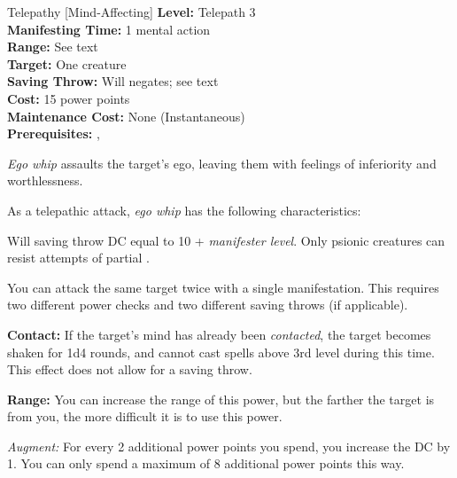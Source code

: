 {Telepathy [Mind-Affecting]}
{
	\textbf{Level:}
	Telepath 3\\
	\textbf{Manifesting Time:}
	1 mental action\\
	\textbf{Range:}
	See text\\
	\textbf{Target:}
	One creature\\
	\textbf{Saving Throw:}
	Will negates; see text\\
	\textbf{Cost:}
	15 power points\\
	\textbf{Maintenance Cost:}
	None (Instantaneous)\\
	\textbf{Prerequisites:}
	, \\
}
{
	\emph{Ego whip} assaults the target's ego, leaving them with feelings of inferiority and worthlessness.

	As a telepathic attack, \emph{ego whip} has the following characteristics:
	\begin{itemize*}
		\item Will saving throw DC equal to 10 + \textit{manifester level}. Only psionic creatures can resist attempts of partial .
		\item You can attack the same target twice with a single manifestation. This requires two different power checks and two different saving throws (if applicable).
	\end{itemize*}

	\textbf{Contact:} If the target's mind has already been \emph{contacted}, the target becomes shaken for 1d4 rounds, and cannot cast spells above 3rd level during this time. This effect does not allow for a saving throw.
	
	\textbf{Range:} You can increase the range of this power, but the farther the target is from you, the more difficult it is to use this power.


	\textit{Augment:} For every 2 additional power points you spend, you increase the DC by 1. You can only spend a maximum of 8 additional power points this way.
}
